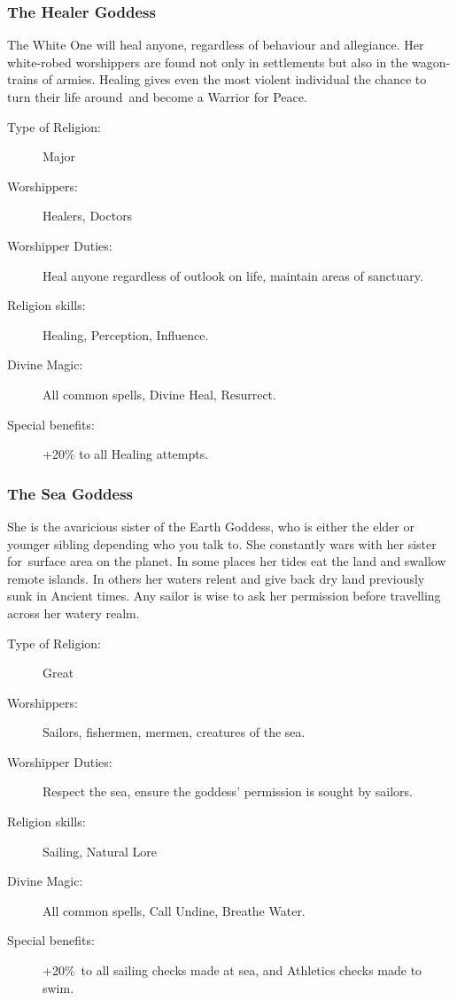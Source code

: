 \subsubsection{The Healer Goddess}
The White One will heal anyone, regardless of behaviour and allegiance. Her white-robed worshippers are found not only in settlements but also in the wagon-trains of armies. Healing gives even the most violent individual the chance to turn their life around and become a Warrior for Peace.

\begin{description}
\item[Type of Religion:] Major
\item[Worshippers:] Healers, Doctors
\item[Worshipper Duties:] Heal anyone regardless of outlook on life, maintain areas of sanctuary.
\item[Religion skills:] Healing, Perception, Influence.
\item[Divine Magic:] All common spells, Divine Heal, Resurrect.
\item[Special benefits:] +20\% to all Healing attempts.
\end{description}


\subsubsection{The Sea Goddess}
She is the avaricious sister of the Earth Goddess, who is either the elder or younger sibling depending who you talk to. She constantly wars with her sister for surface area on the planet. In some places her tides eat the land and swallow remote islands. In others her waters relent and give back dry land previously sunk in Ancient times. Any sailor is wise to ask her permission before travelling across her watery realm.

\begin{description}
\item[Type of Religion:] Great
\item[Worshippers:] Sailors, fishermen, mermen, creatures of the sea.
\item[Worshipper Duties:] Respect the sea, ensure the goddess’ permission is sought by sailors. 
\item[Religion skills:] Sailing, Natural Lore
\item[Divine Magic:] All common spells, Call Undine, Breathe Water.
\item[Special benefits:] +20\% to all sailing checks made at sea, and Athletics checks made to swim. 
\end{description}


